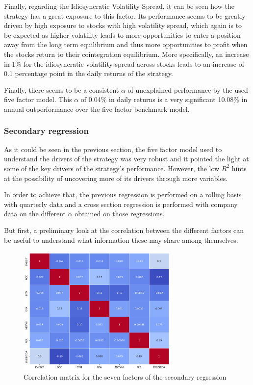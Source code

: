 Finally, regarding the Idiosyncratic Volatility Spread, it can be seen how the strategy has a great exposure to this factor. Its performance seems to be greatly driven by high exposure to stocks with high volatility spread, which again is to be expected as higher volatility leads to more opportunities to enter a position away from the long term equilibrium and thus more opportunities to profit when the stocks return to their cointegration equilibrium. More specifically, an increase in 1\% for the idiosyncratic volatility spread across stocks leads to an increase of 0.1 percentage point in the daily returns of the strategy. 

Finally, there seems to be a consistent $\alpha$ of unexplained performance by the used five factor model. This $\alpha$ of 0.04\% in daily returns is a very significant 10.08\% in annual outperformance over the five factor benchmark model. 

\subsubsection{Secondary regression}
As it could be seen in the previous section, the five factor model used to understand the drivers of the strategy was very robust and it pointed the light at some of the key drivers of the strategy's performance. However, the low $R^2$ hints at the possibility of uncovering more of its drivers through more variables. 

In order to achieve that, the previous regression is performed on a rolling basis with quarterly data and a cross section regression is performed with company data on the different $\alpha$ obtained on those regressions. 

But first, a preliminary look at the correlation between the different factors can be useful to understand what information these may share among themselves. 
\newpage

\begin{figure}[ht]
    \centering
    \includegraphics[width=300px]{assets/factors-secondary-corr-matrix.png}
    \caption{Correlation matrix for the seven factors of the secondary regression}
    \label{fig:factors-secondary-corr-matrix}
\end{figure}

